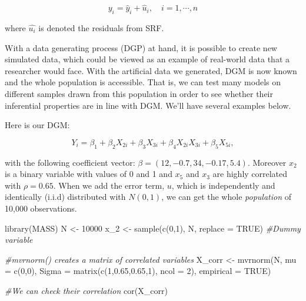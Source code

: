 \documentclass[
]{book}
\newenvironment{Shaded}{\begin{snugshade}}{\end{snugshade}}
\newcommand{\AttributeTok}[1]{\textcolor[rgb]{0.77,0.63,0.00}{#1}}
\newcommand{\CommentTok}[1]{\textcolor[rgb]{0.56,0.35,0.01}{\textit{#1}}}
\newcommand{\ConstantTok}[1]{\textcolor[rgb]{0.00,0.00,0.00}{#1}}
\newcommand{\DecValTok}[1]{\textcolor[rgb]{0.00,0.00,0.81}{#1}}
\newcommand{\FloatTok}[1]{\textcolor[rgb]{0.00,0.00,0.81}{#1}}
\newcommand{\FunctionTok}[1]{\textcolor[rgb]{0.00,0.00,0.00}{#1}}
\newcommand{\NormalTok}[1]{#1}
\newcommand{\OtherTok}[1]{\textcolor[rgb]{0.56,0.35,0.01}{#1}}
\begin{document}
\[
y_{i}=\hat{y}_{i}+\hat{u}_{i}, \quad i=1, \cdots, n
\]

where \(\hat{u_i}\) is denoted the residuals from SRF.

With a data generating process (DGP) at hand, it is possible to create new simulated data, which could be viewed as an example of real-world data that a researcher would face. With the artificial data we generated, DGM is now known and the whole population is accessible. That is, we can test many models on different samples drawn from this population in order to see whether their inferential properties are in line with DGM. We'll have several examples below.

Here is our DGM:

\[
Y_{i}=\beta_{1}+\beta_{2} X_{2 i}+\beta_{3} X_{3 i}+\beta_{4} X_{2 i} X_{3 i}+\beta_{5} X_{5 i},
\]

with the following coefficient vector: \(\beta = (12, -0.7, 34, -0.17, 5.4)\). Moreover \(x_2\) is a binary variable with values of 0 and 1 and \(x_5\) and \(x_3\) are highly correlated with \(\rho = 0.65\). When we add the error term, \(u\), which is independently and identically (i.i.d) distributed with \(N(0,1)\), we can get the whole \emph{population} of 10,000 observations.

\begin{Shaded}
\begin{Highlighting}[]
\FunctionTok{library}\NormalTok{(MASS)}
\NormalTok{N }\OtherTok{\textless{}{-}} \DecValTok{10000}
\NormalTok{x\_2 }\OtherTok{\textless{}{-}} \FunctionTok{sample}\NormalTok{(}\FunctionTok{c}\NormalTok{(}\DecValTok{0}\NormalTok{,}\DecValTok{1}\NormalTok{), N, }\AttributeTok{replace =} \ConstantTok{TRUE}\NormalTok{) }\CommentTok{\#Dummy variable}

\CommentTok{\#mvrnorm() creates a matrix of correlated variables }
\NormalTok{X\_corr }\OtherTok{\textless{}{-}} \FunctionTok{mvrnorm}\NormalTok{(N, }\AttributeTok{mu =} \FunctionTok{c}\NormalTok{(}\DecValTok{0}\NormalTok{,}\DecValTok{0}\NormalTok{), }\AttributeTok{Sigma =} \FunctionTok{matrix}\NormalTok{(}\FunctionTok{c}\NormalTok{(}\DecValTok{1}\NormalTok{,}\FloatTok{0.65}\NormalTok{,}\FloatTok{0.65}\NormalTok{,}\DecValTok{1}\NormalTok{), }\AttributeTok{ncol =} \DecValTok{2}\NormalTok{),}
               \AttributeTok{empirical =} \ConstantTok{TRUE}\NormalTok{)}

\CommentTok{\#We can check their correlation}
\FunctionTok{cor}\NormalTok{(X\_corr)}
\end{Highlighting}
\end{Shaded}
\end{document}
